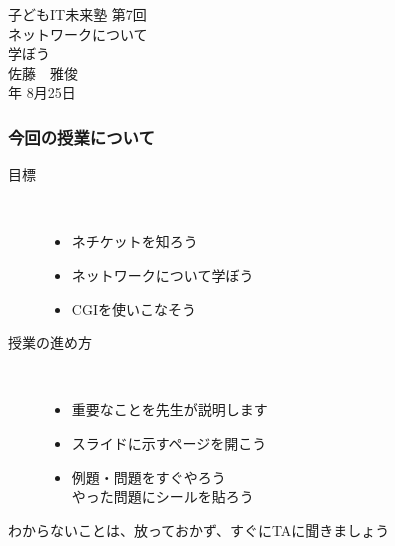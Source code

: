 \begin{frame}
   \begin{center}
    \huge{子どもIT未来塾}
    \vspace{20pt}
	   {\huge 第7回}\\
	   {\huge ネットワークについて\\学ぼう}\\
    \vspace{24pt}
    \large{佐藤　雅俊}\\
    \vspace{10pt}
    \large{\the\year 年 8月25日}
  \end{center}
\end{frame}


\begin{frame}
	\frametitle{今回の授業について ~~~}
		

        \begin{description}
			\item[目標] ~\\
				\begin{itemize}\small
					\item ネチケットを知ろう
					\item ネットワークについて学ぼう
					\item CGIを使いこなそう
				\end{itemize}

			\item[授業の進め方]~\\
				\begin{itemize}\small
					\item 重要なことを先生が説明します
					\item スライドに示すページを開こう
					\item 例題・問題をすぐやろう\\
						やった問題にシールを貼ろう
				\end{itemize}
		\end{description}
		\vfill
		わからないことは、放っておかず、すぐにTAに聞きましょう
\end{frame}







